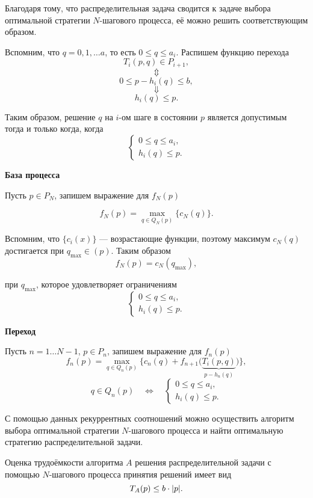 
Благодаря тому, что распределительная задача сводится к задаче выбора оптимальной стратегии $N$-шагового процесса, её можно решить соответствующим образом.

Вспомним, что $q = 0, 1, \dots a$, то есть $\boxed{0 \le q \le a_i}$. Распишем функцию перехода
\[
T_i(p, q) \in P_{i+1},
\]
\[
\Updownarrow
\]
\[
0 \le p - h_i(q) \le b,
\]
\[
\Downarrow
\]
\[
\boxed{h_i(q) \le p}.
\]

Таким образом, решение $q$ на $i$-ом шаге в состоянии $p$ является допустимым тогда и только когда, когда
\[
\begin{cases}
	0 \le q \le a_i, \\
	h_i(q) \le p.
\end{cases}
\]

\bigskip

\textbf{База процесса}

Пусть $p \in P_N$, запишем выражение для $f_N(p)$

\[
f_N(p) = \max_{q \in Q_N(p)} \{c_N(q)\}.
\]

Вспомним, что $\{c_i(x)\}$ --- возрастающие функции, поэтому максимум $c_N(q)$ достигается при $q_{\max} \in (p)$. Таким образом
\[
f_N(p) = c_N(q_{\max}),
\]

при $q_{\max}$, которое удовлетворяет ограничениям
\[
\begin{cases}
	0 \le q \le a_i, \\
	h_i(q) \le p.
\end{cases}
\]

\bigskip

\textbf{Переход}

Пусть $n = 1 \dots N-1$, $p \in P_n$, запишем выражение для $f_n(p)$
\[
f_n(p) = \max_{q \in Q_n(p)} \big\{c_n(q) + f_{n+1}\big(\underbrace{T_i(p, q)}_{p - h_n(q)}\big)\big\},
\]
\[
q \in Q_n(p) \quad \Longleftrightarrow \quad \begin{cases}
	0 \le q \le a_i, \\
	h_i(q) \le p.
\end{cases}
\]

С помощью данных рекуррентных соотношений можно осуществить алгоритм выбора оптимальной стратегии $N$-шагового процесса и найти оптимальную стратегию распределительной задачи.

\fact

Оценка трудоёмкости алгоритма $A$ решения распределительной задачи с помощью $N$-шагового процесса принятия решений имеет вид
\[
T_A(p) \le b \cdot \abs{p}.
\]

